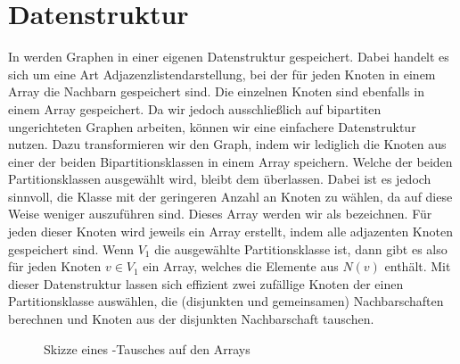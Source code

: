 \section{Datenstruktur}
\label{sec:datenstruktur}
In \nk werden Graphen in einer eigenen Datenstruktur gespeichert.
Dabei handelt es sich um eine Art Adjazenzlistendarstellung, bei der für jeden Knoten 
in einem Array die Nachbarn gespeichert sind. Die einzelnen Knoten sind ebenfalls in
einem Array gespeichert. Da wir jedoch ausschließlich auf bipartiten ungerichteten Graphen
arbeiten, können wir eine einfachere Datenstruktur nutzen. Dazu transformieren wir
den Graph, indem wir lediglich
die Knoten aus einer der beiden Bipartitionsklassen 
in einem Array speichern.
Welche der beiden Partitionsklassen ausgewählt wird, bleibt dem  überlassen.
Dabei ist es jedoch sinnvoll, die Klasse mit der geringeren Anzahl an Knoten zu wählen, da auf diese
Weise weniger  auszuführen sind.
Dieses Array werden wir als  \red{\fett{\partvek}} bezeichnen. 
Für jeden dieser Knoten wird jeweils ein Array erstellt, indem alle adjazenten Knoten gespeichert sind.
Wenn $V_{1}$ die ausgewählte Partitionsklasse ist, dann gibt es also für jeden Knoten $v\in V_{1}$
ein Array, welches die Elemente aus $N(v)$ enthält.
Mit dieser Datenstruktur lassen sich effizient zwei zufällige Knoten der einen Partitionsklasse
auswählen, die (disjunkten und gemeinsamen) Nachbarschaften berechnen und Knoten aus der
disjunkten Nachbarschaft tauschen.
%
%
%
%
%
%
\begin{figure}
\centering
  \caption{Skizze eines \cb-Tausches auf den Arrays}
  \label{fig:curveball_trade_vector}
  
\end{figure}

